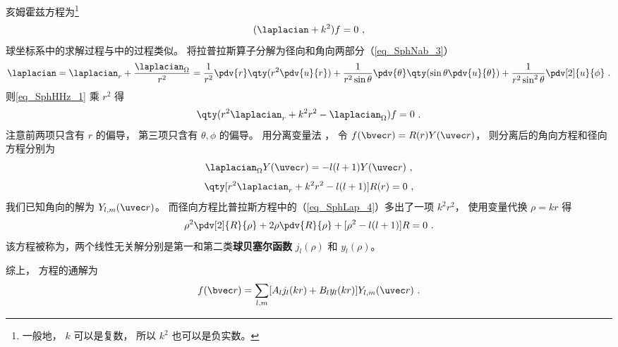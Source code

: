 

亥姆霍兹方程为\footnote{一般地， $k$ 可以是复数， 所以 $k^2$ 也可以是负实数。}
\begin{equation}\label{eq_SphHHz_1}
(\laplacian + k^2)f = 0~,
\end{equation}
球坐标系中的求解过程与中的过程类似。 将拉普拉斯算子分解为径向和角向两部分（\autoref{eq_SphNab_3}）
\begin{equation}
\laplacian = \laplacian_r + \frac{\laplacian_{\Omega}}{r^2} = \frac{1}{r^2} \pdv{r} \qty(r^2 \pdv{u}{r}) + \frac{1}{r^2\sin\theta}\pdv{\theta} \qty(\sin \theta \pdv{u}{\theta}) + \frac{1}{r^2\sin^2 \theta} \pdv[2]{u}{\phi}~.
\end{equation}
则\autoref{eq_SphHHz_1} 乘 $r^2$ 得
\begin{equation}
\qty(r^2\laplacian_r + k^2 r^2 - \laplacian_\Omega) f = 0~.
\end{equation}
注意前两项只含有 $r$ 的偏导， 第三项只含有 $\theta,\phi$ 的偏导。 用分离变量法 %
， 令 $f(\bvec r) = R(r) Y(\uvec r)$， 则分离后的角向方程和径向方程分别为
\begin{equation}
\laplacian_{\Omega} Y(\uvec r) = -l(l+1) Y(\uvec r)~,
\end{equation}
\begin{equation}
\qty[r^2\laplacian_r + k^2 r^2 - l(l+1)] R(r) = 0~,
\end{equation}
我们已知角向的解为 $Y_{l,m}(\uvec r)$。 而径向方程比普拉斯方程中的（\autoref{eq_SphLap_4}）多出了一项 $k^2r^2$， 使用变量代换 $\rho = kr$ 得
\begin{equation}
\rho^2\pdv[2]{R}{\rho} + 2\rho\pdv{R}{\rho} + [\rho^2 - l(l+1)] R = 0~.
\end{equation}
该方程被称为，两个线性无关解分别是第一和第二类\textbf{球贝塞尔函数} $j_l(\rho)$ 和 $y_l(\rho)$。

综上， 方程的通解为
\begin{equation}
f(\bvec r) = \sum_{l,m} [A_l j_l(kr) + B_l y_l(kr)] Y_{l,m}(\uvec r)~.
\end{equation}
